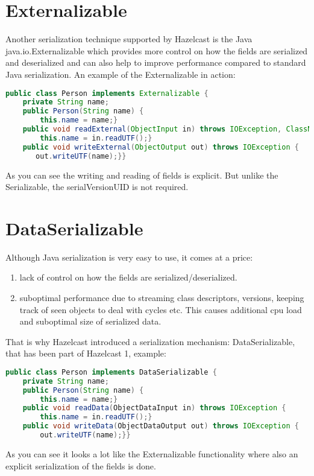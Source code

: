 \section{Externalizable}
Another serialization technique supported by Hazelcast is the Java java.io.Externalizable which provides more control on how the fields are serialized and deserialized and can also help to improve performance compared to standard Java serialization. An example of the Externalizable in action:
\begin{lstlisting}[language=java]
public class Person implements Externalizable {
    private String name;
    public Person(String name) {
        this.name = name;}
    public void readExternal(ObjectInput in) throws IOException, ClassNotFoundException {
        this.name = in.readUTF();}
    public void writeExternal(ObjectOutput out) throws IOException {
       out.writeUTF(name);}}
\end{lstlisting}
As you can see the writing and reading of fields is explicit. But unlike the Serializable, the serialVersionUID is not required.

\section{DataSerializable}
Although Java serialization is very easy to use, it comes at a price:
\begin{enumerate}
\item lack of control on how the fields are serialized/deserialized.
\item suboptimal performance due to streaming class descriptors, versions, keeping track of seen objects to deal with cycles etc. This causes additional cpu load and suboptimal size of serialized data.
\end{enumerate}
That is why Hazelcast introduced a serialization mechanism: DataSerializable, that has been part of Hazelcast 1, example:
\begin{lstlisting}[language=java]
public class Person implements DataSerializable {
    private String name;
    public Person(String name) {
        this.name = name;}
    public void readData(ObjectDataInput in) throws IOException {
        this.name = in.readUTF();}
    public void writeData(ObjectDataOutput out) throws IOException {
        out.writeUTF(name);}}
\end{lstlisting}
As you can see it looks a lot like the Externalizable functionality where also an explicit serialization of the fields is done. 

